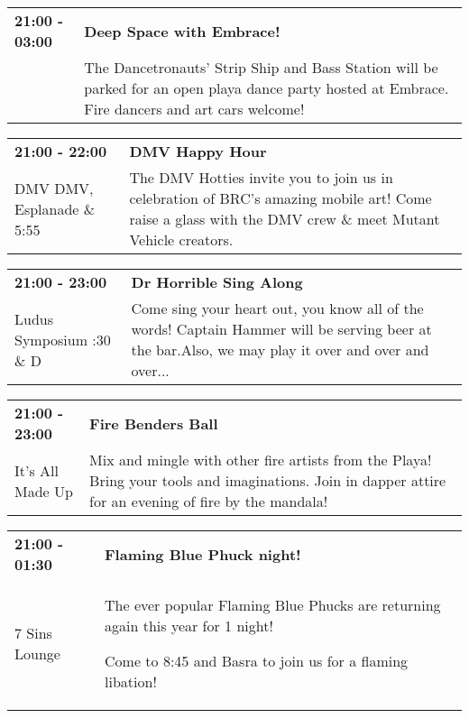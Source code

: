\begin{tabular}{ p{1in} p{2.2in} }
    \textbf{21:00 - 03:00} & \textbf{Deep Space with Embrace!  } \\
    ~ \newline  & The Dancetronauts' Strip Ship and Bass Station will be parked for an open playa dance party hosted at Embrace. Fire dancers and art cars welcome! \\
    \hline 
\end{tabular}
    
\begin{tabular}{ p{1in} p{2.2in} }
    \textbf{21:00 - 22:00} & \textbf{DMV Happy Hour} \\
    DMV \newline DMV, Esplanade \& 5:55 & The DMV Hotties invite you to join us in celebration of BRC's amazing mobile art! Come raise a glass with the DMV crew \& meet Mutant Vehicle creators. \\
    \hline 
\end{tabular}
    
\begin{tabular}{ p{1in} p{2.2in} }
    \textbf{21:00 - 23:00} & \textbf{Dr Horrible Sing Along} \\
    Ludus Symposium \newline 2:30 \& D & Come sing your heart out, you know all of the words! Captain Hammer will be serving beer at the bar.Also, we may play it over and over and over... \\
    \hline 
\end{tabular}
    
\begin{tabular}{ p{1in} p{2.2in} }
    \textbf{21:00 - 23:00} & \textbf{Fire Benders Ball} \\
    It's All Made Up \newline  & Mix and mingle with other fire artists from the Playa! Bring your tools and imaginations. Join in dapper attire for an evening of fire by the mandala! \\
    \hline 
\end{tabular}
    
\begin{tabular}{ p{1in} p{2.2in} }
    \textbf{21:00 - 01:30} & \textbf{Flaming Blue Phuck night!} \\
    7 Sins Lounge \newline  & The ever popular Flaming Blue Phucks are returning again this year for 1 night! 

Come to 8:45 and Basra to join us for a flaming libation! \\
    \hline 
\end{tabular}
    
